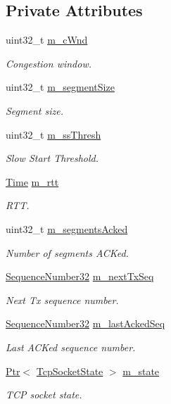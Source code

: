 \subsection*{Private Attributes}
\begin{DoxyCompactItemize}
\item 
uint32\+\_\+t \hyperlink{classTcpVegasTest_a60f99e3ccb08c3ebfd7e7de6896ec2be}{m\+\_\+c\+Wnd}
\begin{DoxyCompactList}\small\item\em Congestion window. \end{DoxyCompactList}\item 
uint32\+\_\+t \hyperlink{classTcpVegasTest_a93c5780c0af6cdfa7af29c0a5688ca0a}{m\+\_\+segment\+Size}
\begin{DoxyCompactList}\small\item\em Segment size. \end{DoxyCompactList}\item 
uint32\+\_\+t \hyperlink{classTcpVegasTest_afee1db7a63768ef7cbf6641f2235c263}{m\+\_\+ss\+Thresh}
\begin{DoxyCompactList}\small\item\em Slow Start Threshold. \end{DoxyCompactList}\item 
\hyperlink{classns3_1_1Time}{Time} \hyperlink{classTcpVegasTest_aea88a087919c8ad57ea580fb684996b4}{m\+\_\+rtt}
\begin{DoxyCompactList}\small\item\em R\+TT. \end{DoxyCompactList}\item 
uint32\+\_\+t \hyperlink{classTcpVegasTest_af429efbb9af0e86883c30c8177e1ee0e}{m\+\_\+segments\+Acked}
\begin{DoxyCompactList}\small\item\em Number of segments A\+C\+Ked. \end{DoxyCompactList}\item 
\hyperlink{group__network_gacb2070e4e98d2d5135c9bede58f07a03}{Sequence\+Number32} \hyperlink{classTcpVegasTest_a861be20b91b8b676667d33a15bc4632d}{m\+\_\+next\+Tx\+Seq}
\begin{DoxyCompactList}\small\item\em Next Tx sequence number. \end{DoxyCompactList}\item 
\hyperlink{group__network_gacb2070e4e98d2d5135c9bede58f07a03}{Sequence\+Number32} \hyperlink{classTcpVegasTest_a46a6d79986d938af919528268e3fb99e}{m\+\_\+last\+Acked\+Seq}
\begin{DoxyCompactList}\small\item\em Last A\+C\+Ked sequence number. \end{DoxyCompactList}\item 
\hyperlink{classns3_1_1Ptr}{Ptr}$<$ \hyperlink{classns3_1_1TcpSocketState}{Tcp\+Socket\+State} $>$ \hyperlink{classTcpVegasTest_a6007fa2677ef19ffe1bdb192900a86b3}{m\+\_\+state}
\begin{DoxyCompactList}\small\item\em T\+CP socket state. \end{DoxyCompactList}\end{DoxyCompactItemize}
